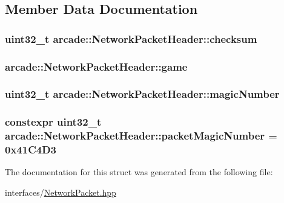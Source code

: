 \subsection{Member Data Documentation}
\hypertarget{structarcade_1_1_network_packet_header_a9ccebe960cf3f7461c2228c48ebe97a2}{
\subsubsection[{checksum}]{\setlength{\rightskip}{0pt plus 5cm}uint32\-\_\-t arcade\-::\-Network\-Packet\-Header\-::checksum}}\label{structarcade_1_1_network_packet_header_a9ccebe960cf3f7461c2228c48ebe97a2}
\hypertarget{structarcade_1_1_network_packet_header_a640a3e1b6eb8c3580f535c593d852241}{
\subsubsection[{game}]{ arcade\-::\-Network\-Packet\-Header\-::game}}\label{structarcade_1_1_network_packet_header_a640a3e1b6eb8c3580f535c593d852241}
\hypertarget{structarcade_1_1_network_packet_header_a4d6f47edd6e4596028680131f8575cae}{
\subsubsection[{magic\-Number}]{\setlength{\rightskip}{0pt plus 5cm}uint32\-\_\-t arcade\-::\-Network\-Packet\-Header\-::magic\-Number}}\label{structarcade_1_1_network_packet_header_a4d6f47edd6e4596028680131f8575cae}
\hypertarget{structarcade_1_1_network_packet_header_a5abaf4eae1f868651c04f94c54b7338f}{
\subsubsection[{packet\-Magic\-Number}]{\setlength{\rightskip}{0pt plus 5cm}constexpr uint32\-\_\-t arcade\-::\-Network\-Packet\-Header\-::packet\-Magic\-Number = 0x41\-C4\-D3\hspace{0.3cm}{\ttfamily [static]}}}\label{structarcade_1_1_network_packet_header_a5abaf4eae1f868651c04f94c54b7338f}


The documentation for this struct was generated from the following file\-:\begin{DoxyCompactItemize}
\item 
interfaces/\hyperlink{_network_packet_8hpp}{Network\-Packet.\-hpp}\end{DoxyCompactItemize}
